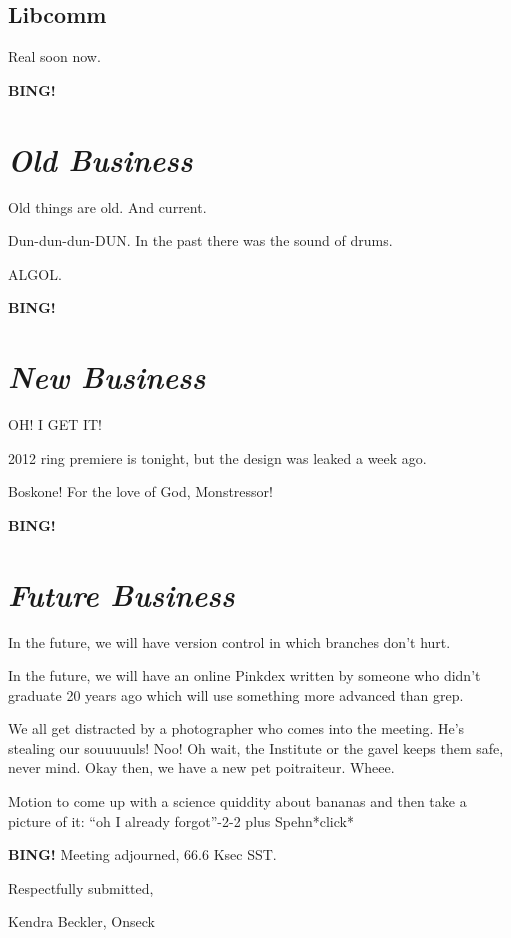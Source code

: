 \documentclass[10pt]{article}
\newcommand{\bing}{{\bf BING!} }
\newcommand{\goto}[1]{\bing \vskip 12pt \section*{{\em{#1}}}}
\newcommand{\ps}{ plus Spehn\xspace}
\newcommand{\onseck}{Kendra Beckler, Onseck}
\begin{document}
\subsection*{Libcomm}

Real soon now.

\goto{Old Business}

Old things are old.  And current.

Dun-dun-dun-DUN.  In the past there was the sound of drums.

ALGOL.

\goto{New Business}

OH!  I GET IT!

2012 ring premiere is tonight, but the design was leaked a week ago.

Boskone!  For the love of God, Monstressor!

\goto{Future Business}

In the future, we will have version control in which branches don't hurt.

In the future, we will have an online Pinkdex written by someone who didn't 
graduate 20 years ago which will use something more advanced than grep.

We all get distracted by a photographer who comes into the meeting.  He's stealing our souuuuuls!  Noo!  Oh wait, the Institute or the gavel keeps them safe, never mind.  Okay then, we have a new pet poitraiteur.  Wheee.

Motion to come up with a science quiddity about bananas and then take a picture of it: ``oh I already forgot''-2-2 \ps *click*

\bing
\noindent
Meeting adjourned, 66.6 Ksec SST.

\vspace{18pt}

\centerline{Respectfully submitted,}
\centerline{\onseck}
\end{document}
